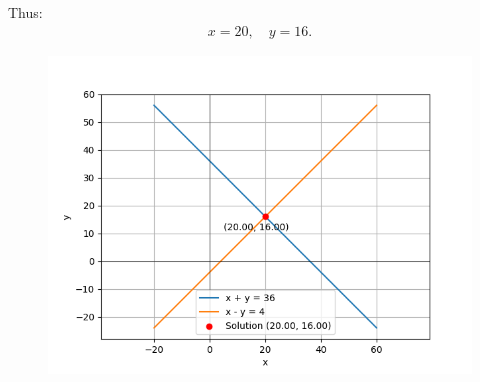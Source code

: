 \documentclass[journal,12pt,onecolumn]{IEEEtran}
\theoremstyle{remark}
\begin{document}
Thus:
\begin{align}
x = 20, \quad y = 16.
\end{align}





\begin{figure}[H]
    \centering
    \includegraphics[width=\columnwidth]{figs/fig.png}
 \end{figure}
\end{document}
